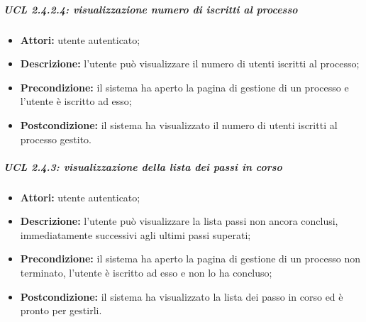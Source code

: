 \subparagraph{UCL 2.4.2.4: visualizzazione numero di iscritti al processo}
\begin{itemize}
\item \textbf{Attori:} utente autenticato;
\item \textbf{Descrizione:} l'utente può visualizzare il numero di utenti iscritti al processo;
\item \textbf{Precondizione:} il sistema ha aperto la pagina di gestione di un processo e l'utente è iscritto ad esso;
\item \textbf{Postcondizione:} il sistema ha visualizzato il numero di utenti iscritti al processo gestito.
\end{itemize}

\subparagraph{UCL 2.4.3: visualizzazione della lista dei passi in corso}
\begin{itemize}
\item \textbf{Attori:} utente autenticato;
\item \textbf{Descrizione:} l'utente può visualizzare la lista passi non ancora conclusi, immediatamente successivi agli ultimi passi superati;
\item \textbf{Precondizione:} il sistema ha aperto la pagina di gestione di un processo non terminato, l'utente è iscritto ad esso e non lo ha concluso;
\item \textbf{Postcondizione:} il sistema ha visualizzato la lista dei passo in corso ed è pronto per gestirli.
\end{itemize}

